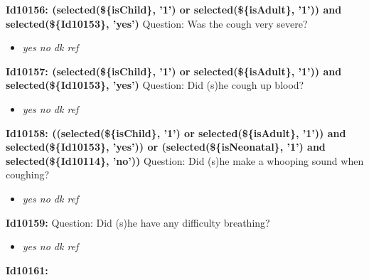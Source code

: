 \documentclass{article}%
\begin{document}
\textbf{Id10156: (selected(\$\{isChild\}, '1') or selected(\$\{isAdult\}, '1')) and selected(\$\{Id10153\}, 'yes')\newline%
}%
Question: Was the cough very severe?\newline%
%
\begin{itemize}%
\item%
\textit{yes\newline%
 no\newline%
 dk\newline%
 ref\newline%
}%
\end{itemize}%
\textbf{Id10157: (selected(\$\{isChild\}, '1') or selected(\$\{isAdult\}, '1')) and selected(\$\{Id10153\}, 'yes')\newline%
}%
Question: Did (s)he cough up blood?\newline%
%
\begin{itemize}%
\item%
\textit{yes\newline%
 no\newline%
 dk\newline%
 ref\newline%
}%
\end{itemize}%
\textbf{Id10158: ((selected(\$\{isChild\}, '1') or selected(\$\{isAdult\}, '1')) and selected(\$\{Id10153\}, 'yes')) or (selected(\$\{isNeonatal\}, '1') and  selected(\$\{Id10114\}, 'no'))\newline%
}%
Question: Did (s)he make a whooping sound when coughing?\newline%
%
\begin{itemize}%
\item%
\textit{yes\newline%
 no\newline%
 dk\newline%
 ref\newline%
}%
\end{itemize}%
\textbf{Id10159: \newline%
}%
Question: Did (s)he have any difficulty breathing?\newline%
%
\begin{itemize}%
\item%
\textit{yes\newline%
 no\newline%
 dk\newline%
 ref\newline%
}%
\end{itemize}%
\textbf{Id10161: \newline%
}%
\end{document}
